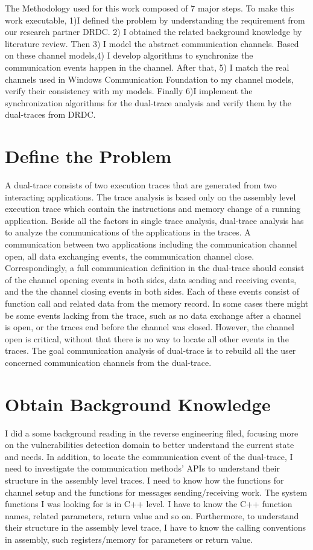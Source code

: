 The Methodology used for this work composed of 7 major steps. To make this work executable, 1)I defined the problem by understanding the requirement from our research partner DRDC. 2) I obtained the related background knowledge by literature review. Then 3) I model the abstract communication channels. Based on these channel models,4) I develop algorithms to synchronize the communication events happen in the channel. After that, 5) I match the real channels used in Windows Communication Foundation to my channel models, verify their consistency with my models. Finally 6)I implement the synchronization algorithms for the dual-trace analysis and verify them by the dual-traces from DRDC.


\label{chapter:problem}

\newlength{\savedunitlength}
\setlength{\unitlength}{2em}
\section{Define the Problem}
A dual-trace consists of two execution traces that are generated from two interacting applications. The trace analysis is based only on the assembly level execution trace which contain the instructions and memory change of a running application. Beside all the factors in single trace analysis, dual-trace analysis has to analyze the communications of the applications in the traces. A communication between two applications including the communication channel open, all data exchanging events, the communication channel close.  Correspondingly, a full communication definition in the dual-trace should consist of the channel opening events in both sides, data sending and receiving events, and the the channel closing events in both sides. Each of these events consist of function call and related data from the memory record. In some cases there might be some events lacking from the trace, such as no data exchange after a channel is open, or the traces end before the channel was closed. However, the channel open is critical, without that there is no way to locate all other events in the traces. The goal communication analysis of dual-trace is to rebuild all the user concerned communication channels from the dual-trace.


\section{Obtain Background Knowledge}
I did a some background reading in the reverse engineering filed, focusing more on the vulnerabilities detection domain to better understand the current state and needs. In addition, to locate the communication event of the dual-trace, I need to investigate the communication methods' APIs to understand their structure in the assembly level traces. I need to know how the functions for channel setup and the functions for messages sending/receiving work. The system functions I was looking for is in C++ level. I have to know the C++ function names, related parameters, return value and so on. Furthermore, to understand their structure in the assembly level trace, I have to know the calling conventions in assembly, such registers/memory for parameters or return value.

